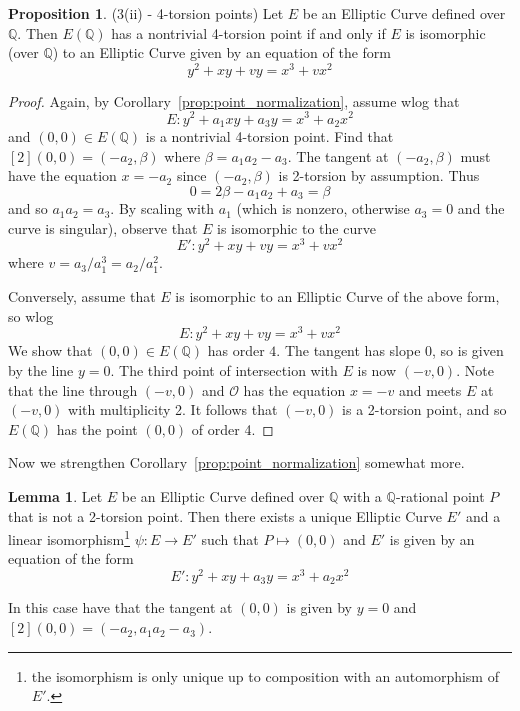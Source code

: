 \documentclass{scrartcl}
\newcommand{\Q}{\mathbb{Q}}
\renewcommand{\O}{\mathcal{O}}
\theoremstyle{definition}
\newtheorem{prop}[subsection]{Proposition}
\newtheorem{lemma}[subsection]{Lemma}
\begin{document}
\begin{prop}(3(ii) - 4-torsion points)
    Let $E$ be an Elliptic Curve defined over $\Q$.
    Then $E(\Q)$ has a nontrivial 4-torsion point if and only if $E$ is isomorphic (over $\Q$) to an Elliptic Curve given by an equation of the form
    \begin{equation*}
        y^2 + x y + v y = x^3 + v x^2
    \end{equation*}
\end{prop}
\begin{proof}
    Again, by Corollary~\ref{prop:point_normalization}, assume wlog that
    \begin{equation*}
        E: y^2 + a_1 x y + a_3 y = x^3 + a_2 x^2
    \end{equation*}
    and $(0, 0) \in E(\Q)$ is a nontrivial 4-torsion point.
    Find that $[2](0, 0) = (-a_2, \beta)$ where $\beta = a_1 a_2 - a_3$.
    The tangent at $(-a_2, \beta)$ must have the equation $x = -a_2$ since $(-a_2, \beta)$ is 2-torsion by assumption.
    Thus
    \begin{equation*}
        0 = 2\beta - a_1a_2 + a_3 = \beta
    \end{equation*}
    and so $a_1a_2 = a_3$.
    By scaling with $a_1$ (which is nonzero, otherwise $a_3 = 0$ and the curve is singular), observe that $E$ is isomorphic to the curve
    \begin{equation*}
        E': y^2 + x y + v y = x^3 + v x^2
    \end{equation*}
    where $v = a_3 / a_1^3 = a_2 / a_1^2$.

    Conversely, assume that $E$ is isomorphic to an Elliptic Curve of the above form, so wlog
    \begin{equation*}
        E: y^2 + x y + v y = x^3 + v x^2
    \end{equation*}
    We show that $(0, 0) \in E(\Q)$ has order $4$.
    The tangent has slope $0$, so is given by the line $y = 0$.
    The third point of intersection with $E$ is now $(-v, 0)$.
    Note that the line through $(-v, 0)$ and $\O$ has the equation $x = -v$ and meets $E$ at $(-v, 0)$ with multiplicity 2.
    It follows that $(-v, 0)$ is a 2-torsion point, and so $E(\Q)$ has the point $(0, 0)$ of order 4.
\end{proof}
Now we strengthen Corollary~\ref{prop:point_normalization} somewhat more.
\begin{lemma}
    Let $E$ be an Elliptic Curve defined over $\Q$ with a $\Q$-rational point $P$ that is not a 2-torsion point.
    Then there exists a unique Elliptic Curve $E'$ and a linear isomorphism\footnote{the isomorphism is only unique up to composition with an automorphism of $E'$.} $\psi: E \to E'$ such that $P \mapsto (0, 0)$ and $E'$ is given by an equation of the form
    \begin{equation*}
        E': y^2 + x y + a_3 y = x^3 + a_2 x^2
    \end{equation*}

    In this case have that the tangent at $(0, 0)$ is given by $y = 0$ and $[2](0, 0) = (-a_2, a_1 a_2 - a_3)$.
\end{lemma}
\end{document}
